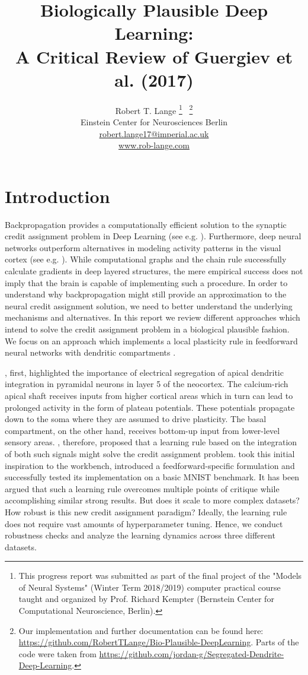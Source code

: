 \documentclass[colorinlistoftodos]{article}
\title{Biologically Plausible Deep Learning: \\
		A Critical Review of Guergiev et al. (2017)}
\author{
  Robert T. Lange \thanks{This progress report was submitted as part of the final project of the "Models of Neural Systems" (Winter Term 2018/2019) computer practical course taught and organized by Prof. Richard Kempter (Bernstein Center for Computational Neuroscience, Berlin).} \ \thanks{Our implementation and further documentation can be found here: \url{https://github.com/RobertTLange/Bio-Plausible-DeepLearning}. Parts of the code were taken from \url{https://github.com/jordan-g/Segregated-Dendrite-Deep-Learning}.} \\
  Einstein Center for Neurosciences Berlin\\
  \url{robert.lange17@imperial.ac.uk} \\
  \url{www.rob-lange.com} \\
}
\theoremstyle{definition}
\begin{document}
\maketitle



\section{Introduction}

Backpropagation \citep{rumelhart1986} provides a computationally efficient solution to the synaptic credit assignment problem in Deep Learning (see e.g. \citet{lecun2015, schmidhuber2015}). Furthermore, deep neural networks outperform alternatives in modeling activity patterns in the visual cortex (see e.g. \citep{yamins_2016, khaligh_2014}).
While computational graphs and the chain rule successfully calculate gradients in deep layered structures, the mere empirical success does not imply that the brain is capable of implementing such a procedure. In order to understand why backpropagation might still provide an approximation to the neural credit assignment solution, we need to better understand the underlying mechanisms and alternatives.
In this report we review different approaches which intend to solve the credit assignment problem in a biological plausible fashion. We focus on an approach which implements a local plasticity rule in feedforward neural networks  with dendritic compartments \citep{guerguiev2017}.

\citet{larkum_1999}, first, highlighted the importance of electrical segregation of apical dendritic integration in pyramidal neurons in layer 5 of the neocortex. The calcium-rich apical shaft receives inputs from higher cortical areas which in turn can lead to prolonged activity in the form of plateau potentials. These potentials propagate down to the soma where they are assumed to drive plasticity. The basal compartment, on the other hand, receives bottom-up input from lower-level sensory areas. \citet{kording2001}, therefore, proposed that a learning rule based on the integration of both such signals might solve the credit assignment problem. \citet{guerguiev2017} took this initial inspiration to the workbench, introduced a feedforward-specific formulation and successfully tested its implementation on a basic MNIST benchmark.   
It has been argued that such a learning rule overcomes multiple points of critique while accomplishing similar strong results. But does it scale to more complex datasets? How robust is this new credit assignment paradigm? Ideally, the learning rule does not require vast amounts of hyperparameter tuning. Hence, we conduct robustness checks and analyze the learning dynamics across three different datasets.
\end{document}
